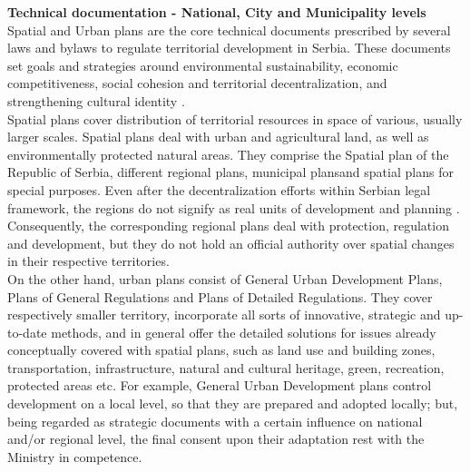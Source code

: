 \documentclass[11pt]{report}
\begin{document}
\textbf{Technical documentation - National, City and Municipality levels}
\\
Spatial and Urban plans are the core technical documents prescribed by several laws and bylaws to regulate territorial development in Serbia.
These documents set goals and strategies around environmental sustainability, economic competitiveness, social cohesion and territorial decentralization, and strengthening cultural identity \cite{(Hirt 2009)}.
\\
Spatial plans cover distribution of territorial resources in space of various, usually larger scales. Spatial plans deal with urban and agricultural land, as well as environmentally protected natural areas. 
They comprise the Spatial plan of the Republic of Serbia, different regional plans\footnotemark, municipal plans\footnotemark and spatial plans for special purposes.
Even after the decentralization efforts within Serbian legal framework, the regions do not signify as real units of development and planning \cite{Vujosevic 2015 Regionalizam u Srbiji 2}. Consequently, the corresponding regional plans deal with protection, regulation and development, but they do not hold an official authority over spatial changes in their respective territories.
\\
On the other hand, urban plans consist of General Urban Development Plans, Plans of General Regulations and Plans of Detailed Regulations.
They cover respectively smaller territory, incorporate all sorts of innovative, strategic and up-to-date methods, and in general offer the detailed solutions for issues already conceptually covered with spatial plans, such as land use and building zones, transportation, infrastructure, natural and cultural heritage, green, recreation, protected areas etc. For example, General Urban Development plans control development on a local level, so that they are prepared and adopted locally; but, being regarded as strategic documents with a certain influence on national and/or regional level, the final consent upon their adaptation rest with the Ministry in competence.
\end{document}
